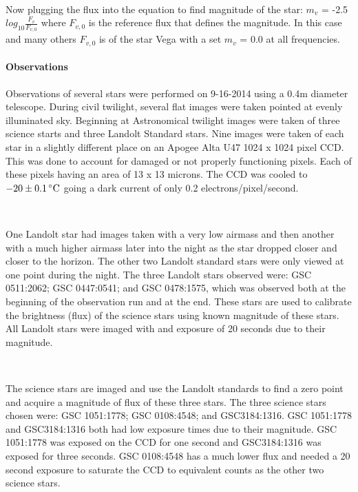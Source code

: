 \documentclass[12 pt,twoside]{article}
\begin{document}
\ \

\indent
Now plugging the flux into the equation to find magnitude of the star: $m_v$  = -2.5$log_{10}$$\frac{F_v}{F_{v,0}}$ where $F_{v,0}$ is the reference flux that defines the magnitude. In this case and many others $F_{v,0}$  is of the star Vega with a set $m_v$ = 0.0 at all frequencies.





\paragraph{Observations}

\indent
Observations of several stars were performed on 9-16-2014 using a 0.4m diameter telescope. During civil twilight, several flat images were taken pointed at evenly illuminated sky. Beginning at Astronomical twilight images were taken of three science starts and three Landolt Standard stars. Nine images were taken of each star in a slightly different place on an Apogee Alta U47 1024 x 1024 pixel CCD. This was done to account for damaged or not properly functioning pixels. Each of these pixels having an area of 13 x 13 microns. The CCD was cooled to $-20 \pm 0.1\,^{\circ}{\rm C}$ going a dark current of only 0.2 electrons/pixel/second.

\ \

\indent
One Landolt star had images taken with a very low airmass and then another with a much higher airmass later into the night as the star dropped closer and closer to the horizon. The other two Landolt standard stars were only viewed at one point during the night. The three Landolt stars observed were: GSC 0511:2062; GSC 0447:0541; and GSC 0478:1575, which was observed both at the beginning of the observation run and at the end. These stars are used to calibrate the brightness (flux) of the science stars using known magnitude of these stars. All Landolt stars were imaged with and exposure of 20 seconds due to their magnitude. 

\ \

\indent
The science stars are imaged and use the Landolt standards to find a zero point and acquire a magnitude of flux of these three stars. The three science stars chosen were: GSC 1051:1778; GSC 0108:4548; and GSC3184:1316. GSC 1051:1778 and GSC3184:1316 both had low exposure times due to their magnitude. GSC 1051:1778 was exposed on the CCD for one second and GSC3184:1316 was exposed for three seconds. GSC 0108:4548 has a much lower flux and needed a 20 second exposure to saturate the CCD to equivalent counts as the other two science stars.
\end{document}

